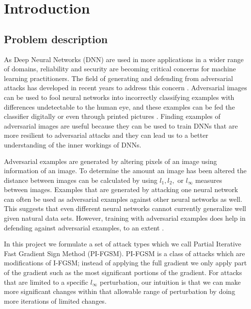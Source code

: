 \section{Introduction}
\subsection{Problem description}
As Deep Neural Networks (DNN) are used in more applications in a wider range of domains, reliability and security are becoming critical concerns for machine learning practitioners. The field of generating and defending from adversarial attacks has developed in recent years to address this concern \cite{szegedy2013intriguing, goodfellow6572explaining}. Adversarial images can be used to fool neural networks into incorrectly classifying examples with differences undetectable to the human eye, and these examples can be fed the classifier digitally or even through printed pictures \cite{kurakin2016adversarial}. Finding examples of adversarial images are useful because they can be used to train DNNs that are more resilient to adversarial attacks \cite{goodfellow6572explaining, madry2017towards} and they can lead us to a better understanding of the inner workings of DNNs.

Adversarial examples are generated by altering pixels of an image using information of an image. To determine the amount an image has been altered the distance between images can be calculated by using $l_1, l_2,$ or $l_\infty$ measures between images. Examples that are generated by attacking one neural network can often be used as adversarial examples against other neural networks as well\cite{szegedy2013intriguing}. This suggests that even different neural networks cannot currently generalize well given natural data sets. However, training with adversarial examples does help in defending against adversarial examples, to an extent \cite{goodfellow6572explaining}.

In this project we formulate a set of attack types which we call Partial Iterative Fast Gradient Sign Method (PI-FGSM). PI-FGSM is a class of attacks which are modifications of I-FGSM; instead of applying the full gradient we only apply part of the gradient such as the most significant portions of the gradient. For attacks that are limited to a specific $l_\infty$ perturbation, our intuition is that we can make more significant changes within that allowable range of perturbation by doing more iterations of limited changes.
